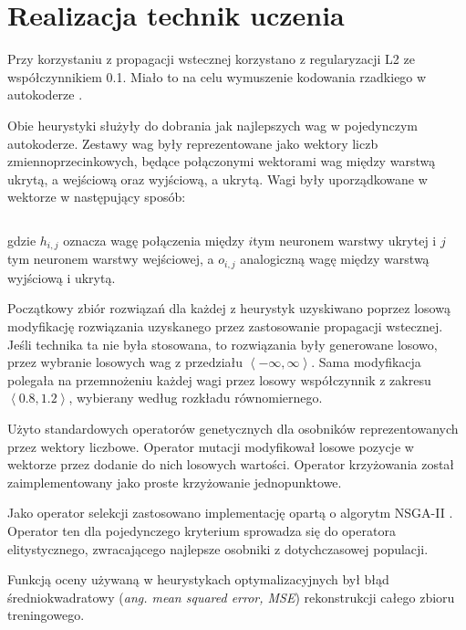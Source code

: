\documentclass[11pt,a4paper,oneside]{report}
\begin{document}
\section{Realizacja technik uczenia}

Przy korzystaniu z propagacji wstecznej korzystano z regularyzacji L2 \cite{girosi1995regularization} ze współczynnikiem 0.1. Miało to na celu wymuszenie kodowania rzadkiego w autokoderze \cite{ngiam2011optimization}.

Obie heurystyki służyły do dobrania jak najlepszych wag w pojedynczym autokoderze. Zestawy wag były reprezentowane jako wektory liczb zmiennoprzecinkowych, będące połączonymi wektorami wag między warstwą ukrytą, a wejściową oraz wyjściową, a ukrytą. Wagi były uporządkowane w wektorze w następujący sposób:

\begin{displaymath}
	[ h_{0, 0}, h_{0, 1}, \ldots, h_{1, 0}, h_{1, 1}, \ldots, o_{0, 0}, o_{0, 1}, \ldots, o_{1, 0}, o_{1, 1}, \ldots ]
\end{displaymath}

gdzie $h_{i, j}$ oznacza wagę połączenia między $i$tym neuronem warstwy ukrytej i $j$tym neuronem warstwy wejściowej, a $o_{i, j}$ analogiczną wagę między warstwą wyjściową i ukrytą.

Początkowy zbiór rozwiązań dla każdej z heurystyk uzyskiwano poprzez losową modyfikację rozwiązania uzyskanego przez zastosowanie propagacji wstecznej. Jeśli technika ta nie była stosowana, to rozwiązania były generowane losowo, przez wybranie losowych wag z przedziału $\left\langle -\infty, \infty \right\rangle $. Sama modyfikacja polegała na przemnożeniu każdej wagi przez losowy współczynnik z zakresu $\left\langle 0.8, 1.2 \right\rangle $, wybierany według rozkładu równomiernego.

Użyto standardowych operatorów genetycznych dla osobników reprezentowanych przez wektory liczbowe. Operator mutacji modyfikował losowe pozycje w wektorze przez dodanie do nich losowych wartości. Operator krzyżowania został zaimplementowany jako proste krzyżowanie jednopunktowe.

Jako operator selekcji zastosowano implementację opartą o algorytm NSGA-II \cite{deb2002fast}. Operator ten dla pojedynczego kryterium sprowadza się do operatora elitystycznego, zwracającego najlepsze osobniki z dotychczasowej populacji.

Funkcją oceny używaną w heurystykach optymalizacyjnych był błąd średniokwadratowy (\textit{ang. mean squared error, MSE}) rekonstrukcji całego zbioru treningowego.
\end{document}
